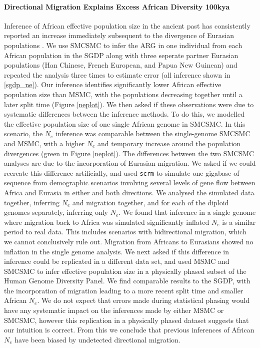 \documentclass{article}
\begin{document}
\paragraph{Directional Migration Explains Excess African Diversity 100kya} Inference of African effective population size in the ancient past has consistently reported an increase immediately subsequent to the divergence of Eurasian populations \cite{Schiffels2014, Li2011}. We use SMCSMC to infer the ARG in one individual from each African population in the SGDP along with three seperate partner Eurasian populations (Han Chinese, French European, and Papua New Guinean) and repeated the analysis three times to estimate error (all inference shown in \ref{sgdp_ne}). Our inference identifies significantly lower African effective population size than MSMC, with the populations decreasing together until a later split time (Figure \ref{neplot}). We then asked if these observations were due to systematic differences between the inference methods. To do this, we modelled the effective population size of one single African genome in SMCSMC. In this scenario, the $N_e$ inference was comparable between the single-genome SMCSMC and MSMC, with a higher $N_e$ and temporary increase around the population divergences (green in Figure \ref{neplot}). The differences between the two SMCSMC analyses are due to the incorporation of Eurasian migration. We asked if we could recreate this difference artificially, and used {\tt scrm} to simulate one gigabase of sequence from demographic scenarios involving several levels of gene flow between Africa and Eurasia in either and both directions. We analysed the simulated data together, inferring $N_e$ and migration together, and for each of the diploid genomes separately, inferring only $N_e$. We found that inference in a single genome where migration back to Africa was simulated significantly inflated $N_e$ is a similar period to real data. This includes scenarios with bidirectional migration, which we cannot conclusively rule out. Migration from Africans to Eurasians showed no inflation in the single genome analysis. We next asked if this difference in inference could be replicated in a different data set, and used MSMC and SMCSMC to infer effective population size in a physically phased subset of the Human Genome Diversity Panel. We find comparable results to the SGDP, with the incorporation of migration leading to a more recent split time and smaller African $N_e$. We do not expect that errors made during statistical phasing would have any systematic impact on the inferences made by either MSMC or SMCSMC, however this replication in a physically phased dataset suggests that our intuition is correct. From this we conclude that previous inferences of African $N_e$ have been biased by undetected directional migration. 
\end{document}
